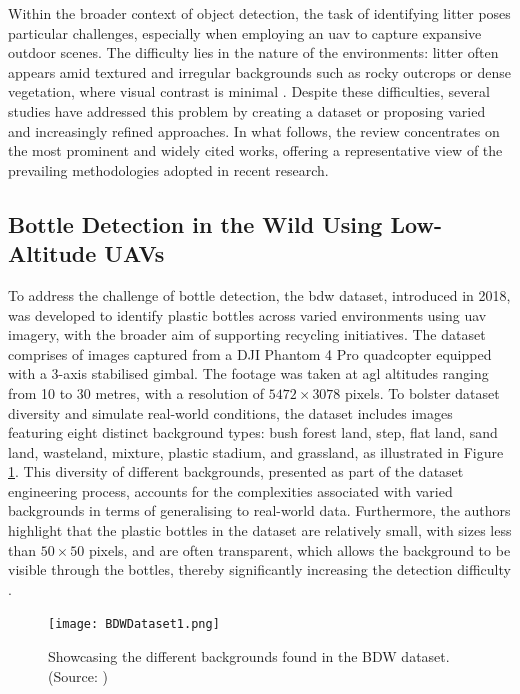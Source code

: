 Within the broader context of object detection, the task of identifying litter poses particular challenges, especially when employing an \gls{uav} to capture expansive outdoor scenes. The difficulty lies in the nature of the environments: litter often appears amid textured and irregular backgrounds such as rocky outcrops or dense vegetation, where visual contrast is minimal \cite{small_litter_detection, taco2020, plastopol}. Despite these difficulties, several studies have addressed this problem by creating a dataset or proposing varied and increasingly refined approaches. In what follows, the review concentrates on the most prominent and widely cited works, offering a representative view of the prevailing methodologies adopted in recent research.

\subsection{Bottle Detection in the Wild Using Low-Altitude UAVs}
\label{subsec:3_bdw}

To address the challenge of bottle detection, the \gls{bdw} dataset, introduced in 2018, was developed to identify plastic bottles across varied environments using \gls{uav} imagery, with the broader aim of supporting recycling initiatives. The dataset comprises of images captured from a DJI Phantom 4 Pro quadcopter equipped with a 3-axis stabilised gimbal. The footage was taken at \gls{agl} altitudes ranging from 10 to 30 metres, with a resolution of $5472 \times 3078$ pixels. 
To bolster dataset diversity and simulate real-world conditions, the dataset includes images featuring eight distinct background types: bush forest land, step, flat land, sand land, wasteland, mixture, plastic stadium, and grassland, as illustrated in Figure \ref{fig:bdw}. This diversity of different backgrounds, presented as part of the dataset engineering process, accounts for the complexities associated with varied backgrounds in terms of generalising to real-world data. Furthermore, the authors highlight that the plastic bottles in the dataset are relatively small, with sizes less than $50 \times 50$ pixels, and are often transparent, which allows the background to be visible through the bottles, thereby significantly increasing the detection difficulty \cite{bdwdataset}.

\begin{figure}[!htbp]
    \centering
    \texttt{[image: BDWDataset1.png]}
    \caption{Showcasing the different backgrounds found in the BDW dataset. (Source: \cite{bdwdataset})}
    \label{fig:bdw}
\end{figure}

